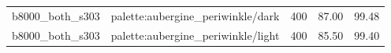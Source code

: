 \begin{longtable}{l>{\raggedright\arraybackslash}p{.42\linewidth}rrr}
b8000\_\allowbreak{}both\_\allowbreak{}s303 & %
palette:aubergine\_\allowbreak{}periwinkle/dark & %
400 & %
87.00 & %
99.48 \\ %

b8000\_\allowbreak{}both\_\allowbreak{}s303 & %
palette:aubergine\_\allowbreak{}periwinkle/light & %
400 & %
85.50 & %
99.40 \\ %


\end{longtable}

